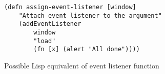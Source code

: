 \begin{figure}[ht]
\begin{verbatim}
(defn assign-event-listener [window]
    "Attach event listener to the argument"
    (addEventListener 
        window 
        "load"
        (fn [x] (alert "All done"))))
\end{verbatim}	
\caption{Possible Lisp equivalent of event listener function}
\label{fig:lispish-attach-event-listener}
\end{figure}